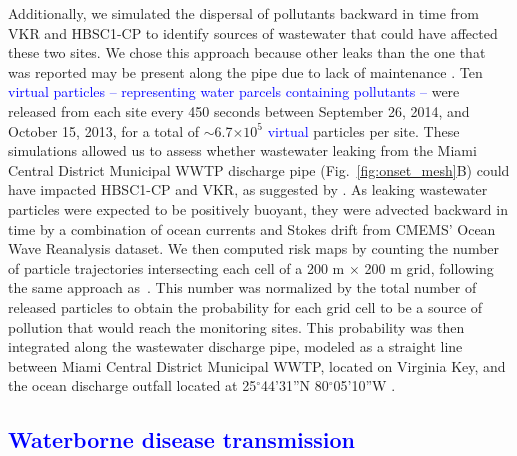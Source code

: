 \documentclass[preprint,12pt,authoryear]{elsarticle}
\newcommand{\modif}[1]{\textcolor{blue}{#1}}
\begin{document}
Additionally, we simulated the dispersal of pollutants backward in time from VKR and HBSC1-CP to identify sources of wastewater that could have affected these two sites. We chose this approach because other leaks than the one that was reported may be present along the pipe due to lack of maintenance \citep{staletovich2017}. Ten \modif{virtual particles -- representing water parcels containing pollutants --} were released from each site every 450 seconds between September 26, 2014, and October 15, 2013, for a total of $\sim$6.7$\times10^5$ \modif{virtual} particles per site. These simulations allowed us to assess whether wastewater leaking from the Miami Central District Municipal WWTP discharge pipe (Fig.~\ref{fig:onset_mesh}B) could have impacted HBSC1-CP and VKR, as suggested by \cite{gintert2019regional}. As leaking wastewater particles were expected to be positively buoyant, they were advected backward in time by a combination of ocean currents and Stokes drift from CMEMS' Ocean Wave Reanalysis dataset. We then computed risk maps by counting the number of particle trajectories intersecting each cell of a 200 m $\times$ 200 m grid, following the same approach as~\cite{anselain2023qatar}. This number was normalized by the total number of released particles to obtain the probability for each grid cell to be a source of pollution that would reach the monitoring sites.
This probability was then integrated along the wastewater discharge pipe, modeled as a straight line between Miami Central District Municipal WWTP, located on Virginia Key, and the ocean discharge outfall located at 25$^\circ$44'31''N 80$^\circ$05'10''W \citep{koopman2006ocean}.

\modif{\subsection{Waterborne disease transmission}}
\end{document}
